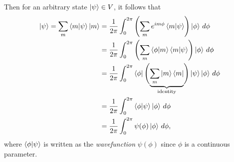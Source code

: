 Then for an arbitrary state $\ket{\psi}\in V$, it follows that
\begin{align*}
    \ket{\psi} = \sum_m \braket{m|\psi}\ket{m} 
        &= \frac{1}{2\pi}\int_{0}^{2\pi} \left( \sum_m e^{im\phi}\braket{m|\psi} \right)\ket{\phi} \,d\phi \\
        &= \frac{1}{2\pi}\int_{0}^{2\pi} \left( \sum_m \braket{\phi|m}\braket{m|\psi} \right)\ket{\phi} \,d\phi \\
        &= \frac{1}{2\pi}\int_{0}^{2\pi} \bra{\phi}\Biggl( \underbrace{\sum_m \ket{m}\bra{m}}_{\textrm{identity}} \Biggr)\ket{\psi}\ket{\phi} \,d\phi \\
        &= \frac{1}{2\pi}\int_{0}^{2\pi} \braket{\phi|\psi}\ket{\phi} \,d\phi \\
        &= \frac{1}{2\pi}\int_{0}^{2\pi} \psi(\phi)\ket{\phi} \,d\phi,
\end{align*}
where $\braket{\phi|\psi}$ is written as the \textit{wavefunction} $\psi(\phi)$ since $\phi$ is a continuous parameter.


